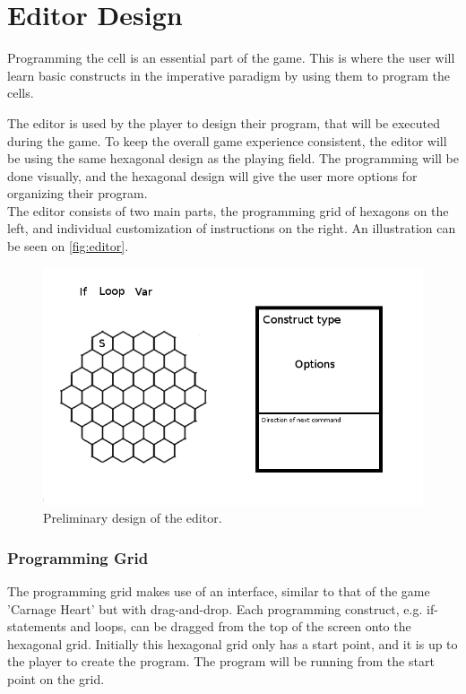 \section{Editor Design}
\label{sec:editor_design}
Programming the cell is an essential part of the game. This is where the user will learn basic constructs in the imperative paradigm by using them to program the cells.

The editor is used by the player to design their program, that will be executed during the game. To keep the overall game experience consistent, the editor will be using the same hexagonal design as the playing field. The programming will be done visually, and the hexagonal design will give the user more options for organizing their program.\\

The editor consists of two main parts, the programming grid of hexagons on the left, and individual customization of instructions on the right. An illustration can be seen on \autoref{fig:editor}.

\begin{figure}[ht]
\includegraphics[width=\textwidth]{img/editor.png}
\caption{Preliminary design of the editor.}
\label{fig:editor}
\end{figure}

\subsubsection*{Programming Grid}
The programming grid makes use of an interface, similar to that of the game 'Carnage Heart' but with drag-and-drop.
Each programming construct, e.g. if-statements and loops, can be dragged from the top of the screen onto the hexagonal grid.
Initially this hexagonal grid only has a start point, and it is up to the player to create the program.
The program will be running from the start point on the grid.

